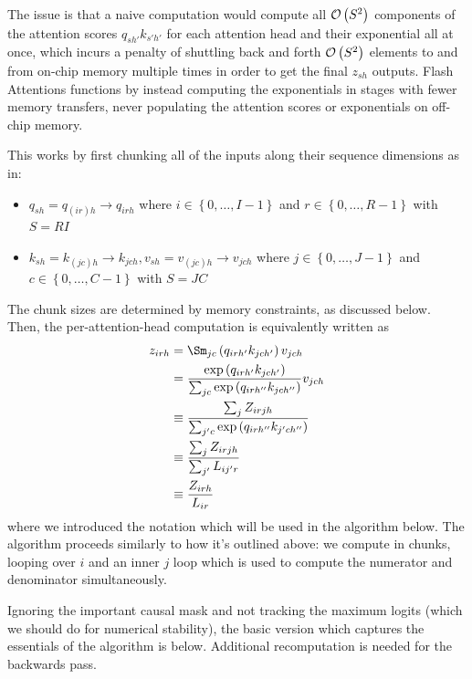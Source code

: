 The issue is that a naive computation would compute all $ \mathcal{O} \left( S ^{ 2 } \right)  $
components of the attention scores $ q _{ sh' } k _{ s'h' } $ for each attention head and their
exponential all at once, which incurs a penalty of shuttling back and forth $ \mathcal{O} \left( S ^{ 2 }
\right)  $ elements to and from on-chip memory multiple times in order to get the final $ z _{ sh }
$ outputs. Flash Attentions functions by instead computing the exponentials in stages with fewer
memory transfers, never populating the attention scores or exponentials on off-chip memory.

This works by first chunking all of the inputs along their sequence dimensions as in:
\begin{itemize}
    \item $  q _{ sh } =q _{ (ir)h }\longrightarrow  q _{ irh }  $ where $ i \in \left \{ 0, \ldots
        , I-1 \right \} $ and $ r \in \left \{ 0, \ldots , R-1 \right \} $ with $ S=RI $
    \item $ k _{ sh } = k _{ (jc)h } \longrightarrow  k _{jch} , v _{ sh } = v _{ (jc)h }
        \longrightarrow  v _{jch} $ where $ j \in \left \{ 0, \ldots , J-1 \right \} $ and $ c \in
        \left \{ 0, \ldots , C-1 \right \} $ with $ S=JC $
\end{itemize}
The chunk sizes are determined by memory constraints, as discussed below.  Then, the
per-attention-head computation is equivalently written as
\begin{align}
    z _{irh} &= \Sm _{jc} \left ( q _{ irh' } k _{ jch' }  \right ) v _{ jch } \nn
             &= \frac{ \exp \left (  q _{ irh' } k _{ jch' }  \right ) }{ \sum _{ jc }\exp \left ( q _{ irh'' } k _{ jch'' } \right ) } v _{ jch }\nn
             &\equiv \frac{\sum _{ j } Z _{ irjh } }{   \sum _{ j'c } \exp \left(q _{ irh'' } k _{ j'ch'' }\right) }\nn
             &\equiv \frac{\sum _{ j } Z _{ irjh } }{\sum _{ j' }L _{ ij'r }}\nn
             &\equiv \frac{ Z _{ irh } }{L _{ ir }}\nn
\end{align}
where we introduced the notation which will be used in the algorithm below. The algorithm proceeds
similarly to how it's outlined above: we compute in chunks, looping over $ i $ and an inner $ j$
loop which is used to compute the numerator and denominator simultaneously.

Ignoring the important causal mask and not tracking the maximum logits (which we should do for
numerical stability), the basic version which captures the essentials of the algorithm is below.
Additional recomputation is needed for the backwards pass.

